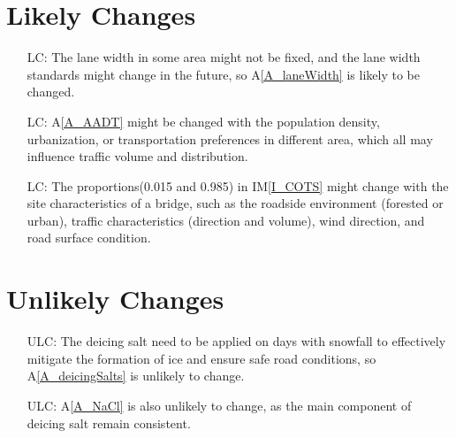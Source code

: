 \documentclass[12pt]{article}
\newcommand{\aref}[1]{A\ref{#1}}
\newcommand{\iref}[1]{IM\ref{#1}}
\newcounter{lcnum} %
\newcounter{ulcnum} %
\begin{document}
\section{Likely Changes}    

\noindent \begin{itemize}

\item[LC\refstepcounter{lcnum}\thelcnum\label{LC_laneWidth}:] The lane width in some area might not be fixed, and the lane width standards might change in the future, so \aref{A_laneWidth} is likely to be changed. 
\item[LC\refstepcounter{lcnum}\thelcnum\label{LC_AADT}:] \aref{A_AADT} might be changed with the population density, urbanization, or transportation preferences in different area, which all may influence traffic volume and distribution.
\item[LC\refstepcounter{lcnum}\thelcnum\label{LC_SASC}:] The proportions(0.015 and 0.985) in \iref{I_COTS} might change with the site characteristics of a bridge, such as the roadside environment (forested or urban), traffic characteristics (direction and volume), wind direction, and road surface condition. 

\end{itemize}

\section{Unlikely Changes}    

\noindent \begin{itemize}
\item[ULC\refstepcounter{ulcnum}\theulcnum\label{ULC_saltSame}:] The deicing salt need to be applied on days with snowfall to effectively mitigate the formation of ice and ensure safe road conditions, so \aref{A_deicingSalts} is unlikely to change.

\item[ULC\refstepcounter{ulcnum}\theulcnum\label{ULC_NaCl}:] \aref{A_NaCl} is also unlikely to change, as the main component of deicing salt remain consistent.


\end{itemize}

\newpage
\end{document}

